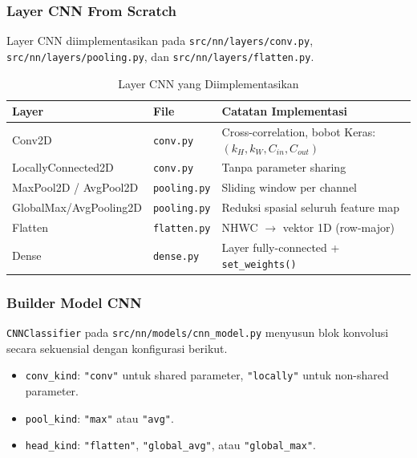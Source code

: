 \subsubsection{Layer CNN From Scratch}
Layer CNN diimplementasikan pada \texttt{src/nn/layers/conv.py}, \texttt{src/nn/layers/pooling.py}, dan \texttt{src/nn/layers/flatten.py}.

\begin{table}[H]
    \centering
    \caption{Layer CNN yang Diimplementasikan}
    \begin{tabular}{lll}
        \toprule
        \textbf{Layer} & \textbf{File} & \textbf{Catatan Implementasi} \\
        \midrule
        Conv2D & \texttt{conv.py} & Cross-correlation, bobot Keras: $(k_H,k_W,C_{in},C_{out})$ \\
        LocallyConnected2D & \texttt{conv.py} & Tanpa parameter sharing \\
        MaxPool2D / AvgPool2D & \texttt{pooling.py} & Sliding window per channel \\
        GlobalMax/AvgPooling2D & \texttt{pooling.py} & Reduksi spasial seluruh feature map \\
        Flatten & \texttt{flatten.py} & NHWC $\rightarrow$ vektor 1D (row-major) \\
        Dense & \texttt{dense.py} & Layer fully-connected + \texttt{set\_weights()} \\
        \bottomrule
    \end{tabular}
    \label{tab:layer-cnn-impl}
\end{table}

\subsubsection{Builder Model CNN}
\texttt{CNNClassifier} pada \texttt{src/nn/models/cnn\_model.py} menyusun blok konvolusi secara sekuensial dengan konfigurasi berikut.

\begin{itemize}
    \item \texttt{conv\_kind}: \texttt{"conv"} untuk shared parameter, \texttt{"locally"} untuk non-shared parameter.
    \item \texttt{pool\_kind}: \texttt{"max"} atau \texttt{"avg"}.
    \item \texttt{head\_kind}: \texttt{"flatten"}, \texttt{"global\_avg"}, atau \texttt{"global\_max"}.
\end{itemize}

